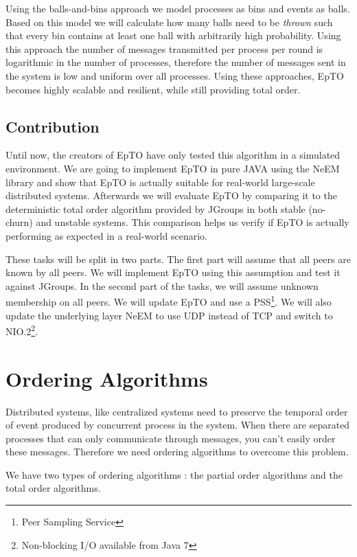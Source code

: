 \documentclass[10pt,conference,a4paper]{IEEEtran}
\begin{document}
\par
Using the balls-and-bins approach we model processes as bins and events as balls. Based on this model we will calculate how many balls need to be \textit{thrown} such that every bin contains at least one ball with arbitrarily high probability. Using this approach the number of messages transmitted per process per round is logarithmic in the number of processes, therefore the number of messages sent in the system is low and uniform over all processes. Using these approaches, EpTO becomes highly scalable and resilient, while still providing total order.

\subsection{Contribution}
Until now, the creators of EpTO have only tested this algorithm in a simulated environment. We are going to implement EpTO in pure JAVA using the NeEM library \autocite{neem} and show that EpTO is actually suitable for real-world large-scale distributed systems. Afterwards we will evaluate EpTO by comparing it to the deterministic total order algorithm provided by JGroups  \autocite{jgroups} in both stable (no-churn) and unstable systems. This comparison helps us verify if EpTO is actually performing as expected in a real-world scenario.
\par
These tasks will be split in two parts. The first part will assume that all peers are known by all peers. We will implement EpTO using this assumption and test it against JGroups. In the second part of the tasks, we will assume unknown membership on all peers. We will update EpTO and use a PSS\footnote{Peer Sampling Service}. We will also update the underlying layer NeEM to use UDP instead of TCP and switch to NIO.2\footnote{Non-blocking I/O available from Java 7}.

\section{Ordering Algorithms}
Distributed systems, like centralized systems need to preserve the temporal order of event produced by concurrent process in the system. When there are separated processes that can only communicate through messages, you can’t easily order these messages.
Therefore we need ordering algorithms to overcome this problem.
\par
We have two types of ordering algorithms \autocite{lamport1978time}: the partial order algorithms and the total order algorithms.
\end{document}

